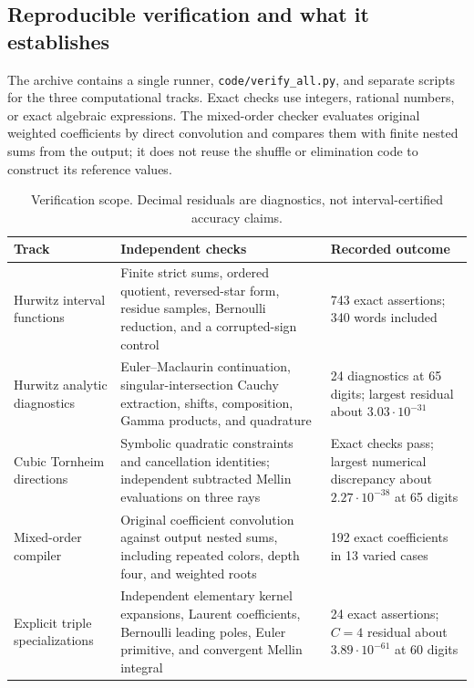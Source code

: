 \documentclass[11pt]{article}
\numberwithin{equation}{section}
\theoremstyle{plain}
\theoremstyle{definition}
\theoremstyle{remark}
\newcommand{\src}[1]{\nolinkurl{#1}}
\begin{document}
\subsection{Reproducible verification and what it establishes}

The archive contains a single runner, \src{code/verify_all.py}, and
separate scripts for the three computational tracks. Exact checks
use integers, rational numbers, or exact algebraic expressions.
The mixed-order checker evaluates original weighted coefficients by
direct convolution and compares them with finite nested sums from
the output; it does not reuse the shuffle or elimination code to
construct its reference values.

\begin{table}[htbp]
\centering\small
\begin{tabular}{@{}L{0.23\textwidth}L{0.46\textwidth}L{0.24\textwidth}@{}}
\toprule
Track & Independent checks & Recorded outcome \\
\midrule
Hurwitz interval functions
& Finite strict sums, ordered quotient, reversed-star form, residue
  samples, Bernoulli reduction, and a corrupted-sign control
& 743 exact assertions; 340 words included \\
\addlinespace
Hurwitz analytic diagnostics
& Euler--Maclaurin continuation, singular-intersection Cauchy
  extraction, shifts, composition, Gamma products, and quadrature
& 24 diagnostics at 65 digits; largest residual about
  $3.03\cdot10^{-31}$ \\
\addlinespace
Cubic Tornheim directions
& Symbolic quadratic constraints and cancellation identities;
  independent subtracted Mellin evaluations on three rays
& Exact checks pass; largest numerical discrepancy about
  $2.27\cdot10^{-38}$ at 65 digits \\
\addlinespace
Mixed-order compiler
& Original coefficient convolution against output nested sums,
  including repeated colors, depth four, and weighted roots
& 192 exact coefficients in 13 varied cases \\
\addlinespace
Explicit triple specializations
& Independent elementary kernel expansions, Laurent coefficients,
  Bernoulli leading poles, Euler primitive, and convergent Mellin integral
& 24 exact assertions; $C=4$ residual about $3.89\cdot10^{-61}$
  at 60 digits \\
\bottomrule
\end{tabular}
\caption{Verification scope. Decimal residuals are diagnostics, not
interval-certified accuracy claims.}\label{audit:checks}
\end{table}
\end{document}
